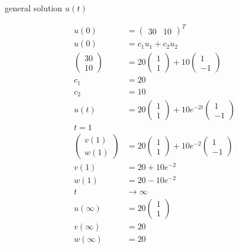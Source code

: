 \documentclass[main.tex]{subfiles}
\begin{document}
\begin{enumerate}
    general solution $u(t)$

    $$
    \begin{aligned}
    u(0)&=\left(\begin{array}{ll}
    30 & 10
    \end{array}\right)^{T}\\
    u(0)&=c_{1} u_{1}+c_{2} u_{2}\\
    \left(\begin{array}{l}
    30 \\
    10
    \end{array}\right)&=20\left(\begin{array}{l}
    1 \\
    1
    \end{array}\right)+10\left(\begin{array}{c}
    1 \\
    -1
    \end{array}\right)\\
    c_1&=20\\
    c_2&=10\\
    u(t)&=20\left(\begin{array}{l}
    1 \\
    1
    \end{array}\right)+10 e^{-2 t}\left(\begin{array}{l}
    1 \\
    -1
    \end{array}\right)\\
    t=1\\
    \left(\begin{array}{l}
    v(1) \\
    w(1)
    \end{array}\right)&=20\left(\begin{array}{l}
    1 \\
    1
    \end{array}\right)+10 e^{-2}\left(\begin{array}{l}
    1 \\
    -1
    \end{array}\right)\\
    v(1)&=20+10 e^{-2} \\
    w(1)&=20-10 e^{-2} \\
    t &\rightarrow \infty \\
    u(\infty)&=20\left(\begin{array}{l}
    1 \\
    1
    \end{array}\right)\\
    v(\infty)&=20 \\
    w(\infty)&=20
    \end{aligned}
    $$
    

\end{enumerate}
\end{document}
